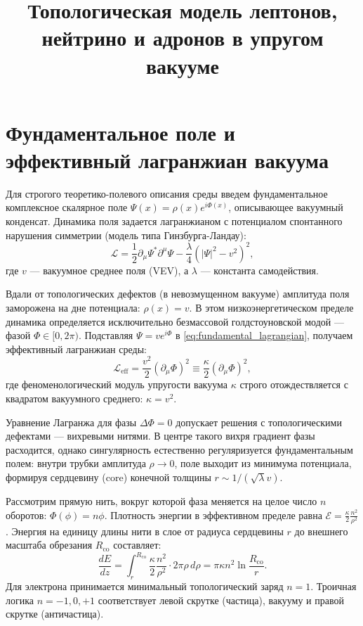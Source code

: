 \documentclass[12pt,a4paper]{article}
\title{Топологическая модель лептонов, нейтрино и адронов в упругом вакууме}
\author{}
\date{}
\begin{document}
\maketitle

\section{Фундаментальное поле и эффективный лагранжиан вакуума}

Для строгого теоретико-полевого описания среды введем фундаментальное комплексное скалярное поле $\Psi(x) = \rho(x) e^{i\Phi(x)}$, описывающее вакуумный конденсат. Динамика поля задается лагранжианом с потенциалом спонтанного нарушения симметрии (модель типа Гинзбурга-Ландау):
\begin{equation}
\mathcal{L} = \frac{1}{2} \partial_\mu \Psi^* \partial^\mu \Psi - \frac{\lambda}{4} (|\Psi|^2 - v^2)^2,
\label{eq:fundamental_lagrangian}
\end{equation}
где $v$ — вакуумное среднее поля (VEV), а $\lambda$ — константа самодействия. 

Вдали от топологических дефектов (в невозмущенном вакууме) амплитуда поля заморожена на дне потенциала: $\rho(x) = v$. В этом низкоэнергетическом пределе динамика определяется исключительно безмассовой голдстоуновской модой — фазой $\Phi \in [0, 2\pi)$. Подставляя $\Psi = v e^{i\Phi}$ в \eqref{eq:fundamental_lagrangian}, получаем эффективный лагранжиан среды:
\begin{equation}
\mathcal{L}_{\text{eff}} = \frac{v^2}{2} (\partial_\mu \Phi)^2 \equiv \frac{\kappa}{2} (\partial_\mu \Phi)^2,
\label{eq:effective_lagrangian}
\end{equation}
где феноменологический модуль упругости вакуума $\kappa$ строго отождествляется с квадратом вакуумного среднего: $\kappa = v^2$. 

Уравнение Лагранжа для фазы $\Delta\Phi = 0$ допускает решения с топологическими дефектами — вихревыми нитями. В центре такого вихря градиент фазы расходится, однако сингулярность естественно регуляризуется фундаментальным полем: внутри трубки амплитуда $\rho \to 0$, поле выходит из минимума потенциала, формируя сердцевину (core) конечной толщины $r \sim 1/(\sqrt{\lambda}v)$.

Рассмотрим прямую нить, вокруг которой фаза меняется на целое число $n$ оборотов: $\Phi(\phi) = n\phi$. Плотность энергии в эффективном пределе равна $\mathcal{E} = \frac{\kappa}{2} \frac{n^2}{\rho^2}$. Энергия на единицу длины нити в слое от радиуса сердцевины $r$ до внешнего масштаба обрезания $R_{\text{co}}$ составляет:
\begin{equation}
\frac{dE}{dz} = \int_{r}^{R_{\text{co}}} \frac{\kappa}{2} \frac{n^2}{\rho^2} \cdot 2\pi\rho \, d\rho = \pi \kappa n^2 \ln\frac{R_{\text{co}}}{r}.
\label{eq:energy_density}
\end{equation}
Для электрона принимается минимальный топологический заряд $n = 1$. Троичная логика $n = -1, 0, +1$ соответствует левой скрутке (частица), вакууму и правой скрутке (античастица).
\end{document}
